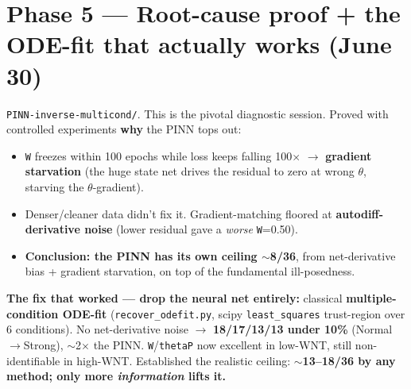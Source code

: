 \documentclass[11pt]{article}
\newcommand{\code}[1]{\texttt{\textcolor{codegray}{#1}}}
\begin{document}
\section*{Phase 5 --- Root-cause proof + the ODE-fit that actually works (June 30)}
\code{PINN-inverse-multicond/}. This is the pivotal diagnostic session. Proved with controlled experiments \textbf{why} the PINN tops out:
\begin{itemize}
\item \code{W} freezes within 100 epochs while loss keeps falling 100$\times$ $\rightarrow$ \textbf{gradient starvation} (the huge state net drives the residual to zero at wrong $\theta$, starving the $\theta$-gradient).
\item Denser/cleaner data didn't fix it. Gradient-matching floored at \textbf{autodiff-derivative noise} (lower residual gave a \textit{worse} \code{W}=0.50).
\item \textbf{Conclusion: the PINN has its own ceiling $\sim$8/36}, from net-derivative bias + gradient starvation, on top of the fundamental ill-posedness.
\end{itemize}
\textbf{The fix that worked --- drop the neural net entirely:} classical \textbf{multiple-condition ODE-fit} (\code{recover\_odefit.py}, scipy \code{least\_squares} trust-region over 6 conditions). No net-derivative noise $\rightarrow$ \textbf{18/17/13/13 under 10\%} (Normal$\rightarrow$Strong), $\sim$2$\times$ the PINN. \code{W}/\code{thetaP} now excellent in low-WNT, still non-identifiable in high-WNT. Established the realistic ceiling: \textbf{$\sim$13--18/36 by any method; only more \textit{information} lifts it.}
\end{document}
